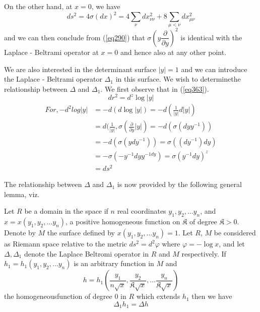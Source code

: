 On the other hand, at $x = 0$, we have
$$
ds^2 = 4 \sigma(d x)^2 = 4 \sum_\nu dx^2_{\nu \nu} + 8 \sum_{\mu <
  \nu} dx^2_{\mu \nu} 
$$
and we can then conclude from (\ref{eq290}) that $\sigma (y
\dfrac{\partial}{\partial y})^2$ is identical with the Laplace -
Beltrami operator at $x = 0$ and hence also at any other point.  

We are also interested in the determinant surface $|y| = 1$ and we can
introduce the Laplace - Beltrami operator $\Delta_1$ in this
surface. We wish to determine\pageoriginale the relationship between
$\Delta$ and $\Delta_1$. We first observe that in (\ref{eq363}).  
\begin{equation*}
dr^2 = d^z \log  |y| \tag{367}\label{eq367}
\end{equation*}
\begin{align*}
For, -d^2 log |y| & = -d (d \log |y|) = -d (\frac{1}{|y|} d|y|) \\
& = d (\frac{1}{|y|}, \sigma (\frac{\partial}{\partial y} |y|) = -d
(\sigma (d y y^{-1})) \\ 
& = -d (\sigma ( y dy^{-1})) = \sigma ((dy ^{-1}) dy) \\
& = -  \sigma (- y^{-1} dy y^{-1 dy}) = \sigma (y^{-1} dy)^z \\
& = ds^2
\end{align*}

The relationship between $\Delta$ and $\Delta_1$ is now provided by
the following general lemma, viz. 

\setcounter{lem}{24}
\begin{lem}\label{chap17:lem25}%
 Let $R$ be a domain in the space if $n$ real
  coordinates \break $y_1 , y_2 , \ldots y_n$, and $x = x (y_1, y_2 ,
\ldots y_n)$,  a positive homogeneous function on $\mathfrak{K}$  of
  degree \; $\mathfrak{K} > 0$.  Denote by $M$  the surface
  defined by \break $x (y_1, y_2 , \ldots y_n) = 1$. Let $R$, $M$ be
  considered as Riemann space relative to the metric $ds^2 = d^2
\varphi$ where $\varphi =  -  \log x$, and let $\Delta, \Delta _1$
  denote the Laplace Beltromi operator in $R$ and $M$ 
  respectively. If $h_1 = h_1 (y_1, y_2 , \ldots y_n)$ is an
  arbitrary function in $M$ and 
$$ 
h = h_1( \dfrac{y_1}{n \sqrt{x}} ,
\dfrac{y_2}{\mathfrak{K}\sqrt{x}}, \ldots
\dfrac{y_n}{\mathfrak{K}\sqrt{x}}) 
$$
 the homogeneous\pageoriginale function of degree 0 in $R$ which
 extends $h_1$ then  we have   
\begin{equation*}
\Delta_1 h_1 = \Delta h \tag{368}\label{eq368}
\end{equation*}
\end{lem}

